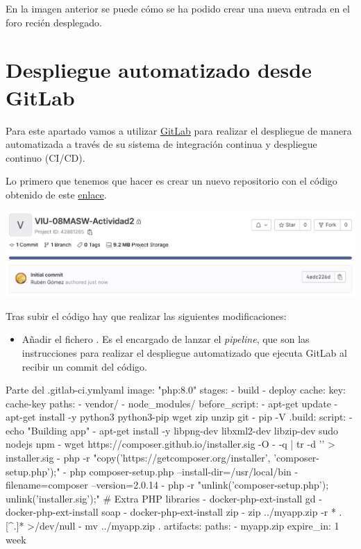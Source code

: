 \documentclass{\ClassPath/viu-tfm-template}
\begin{document}
En la imagen anterior se puede cómo se ha podido crear una nueva entrada en el foro recién desplegado.


\chapter{Despliegue automatizado desde GitLab}

Para este apartado vamos a utilizar \href{https://gitlab.com/}{GitLab} para realizar el despliegue de manera automatizada a través de su sistema de integración continua y despliegue continuo (CI/CD).

Lo primero que tenemos que hacer es crear un nuevo repositorio con el código obtenido de este \href{https://amn-viu-resources-public.s3.eu-west-1.amazonaws.com/08masw/actividad2/flarum_php8.0.zip}{enlace}.

\begin{center}
    \includegraphics[frame,width=\linewidth]{img/gitlab.png}
\end{center}

Tras subir el código hay que realizar las siguientes modificaciones:

\begin{itemize}
    \item Añadir el fichero . Es el encargado de lanzar el \textit{pipeline}, que son las instrucciones para realizar el despliegue automatizado que ejecuta GitLab al recibir un commit del código.
\end{itemize}
\begin{mycode}{Parte del .gitlab-ci.yml}{yaml}{{\scriptsize }}
image: "php:8.0"
stages:
  - build
  - deploy
cache:
  key: cache-key
  paths:
  - vendor/
  - node_modules/
before_script:
  - apt-get update
  - apt-get install -y python3 python3-pip wget zip unzip git
  - pip -V
.build:
  script:
    - echo "Building app"
    - apt-get install -y libpng-dev libxml2-dev libzip-dev sudo nodejs npm
    - wget https://composer.github.io/installer.sig -O - -q | tr -d '\n' > installer.sig
    - php -r "copy('https://getcomposer.org/installer', 'composer-setup.php');"
    - php composer-setup.php --install-dir=/usr/local/bin -filename=composer --version=2.0.14
    - php -r "unlink('composer-setup.php'); unlink('installer.sig');"
    # Extra PHP libraries
    - docker-php-ext-install gd
    - docker-php-ext-install soap
    - docker-php-ext-install zip
    - zip ../myapp.zip -r * .[^.]* >/dev/null
    - mv ../myapp.zip .
  artifacts:
    paths:
    - myapp.zip
    expire_in: 1 week\end{mycode}
\end{document}
